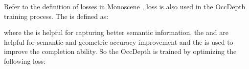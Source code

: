 \documentclass{article}
\begin{document}
	Refer to the definition of losses in Monoscene \cite{Cao_2022_CVPR},  loss is also used in the 
 OccDepth training process. The  is defined as:
     
      where the  is helpful for capturing better semantic information, the   and  are helpful for semantic and geometric accuracy improvement and the  is used to improve the completion ability. 
	So the OccDepth is trained by optimizing the following loss:

\begin{table}[!t]
		\flushleft
		\begin{subtable}[!]{0.5\textwidth}
			\centering
			\caption{SemanticKITTI (hidden test set)}
			\label{mainResults0}
		\end{subtable}
		
		\begin{subtable}[!]{0.5\textwidth}
			\centering
\end{subtable}
\end{table}
\end{document}
